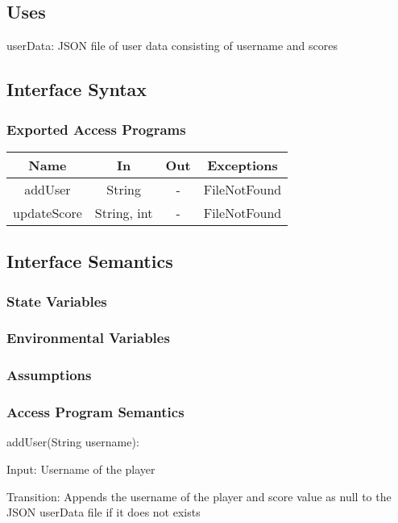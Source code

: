 \documentclass[12,english]{article}
\begin{document}
        \subsection{Uses}
        userData: JSON file of user data consisting of username and scores
		\subsection{Interface Syntax}
		\subsubsection{Exported Access Programs}
		\begin{tabular}[pos]{|c|c|c|c|}
			
			\hline
			\textbf{Name}& \textbf{In} & \textbf{Out} & \textbf{Exceptions} \\ \hline
            addUser & String & - & FileNotFound\\ \hline
			updateScore & String, int & - & FileNotFound\\ \hline
			
		\end{tabular}
		
		\subsection{Interface Semantics}
		\subsubsection{State Variables}
	
		
		\subsubsection{Environmental Variables}

		\subsubsection{Assumptions}
		
		\subsubsection{Access Program Semantics}
		
		addUser(String username): 
		
    	Input: Username of the player
    	
    	Transition: Appends the username of the player and score value as null to the JSON userData file if it does not exists
    	
\end{document}

